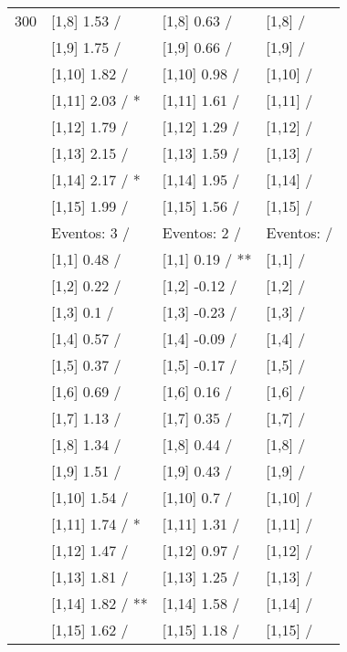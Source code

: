 \begin{table}
\begin{tabular}[t]{llll}
300 & {}[1,8] 1.53  / & {}[1,8] 0.63  / & {}[1,8]  /\\
\addlinespace
 & {}[1,9] 1.75  / & {}[1,9] 0.66  / & {}[1,9]  /\\
 & {}[1,10] 1.82  / & {}[1,10] 0.98  / & {}[1,10]  /\\
 & {}[1,11] 2.03  / * & {}[1,11] 1.61  / & {}[1,11]  /\\
 & {}[1,12] 1.79  / & {}[1,12] 1.29  / & {}[1,12]  /\\
 & {}[1,13] 2.15  / & {}[1,13] 1.59  / & {}[1,13]  /\\
\addlinespace
 & {}[1,14] 2.17  / * & {}[1,14] 1.95  / & {}[1,14]  /\\
 & {}[1,15] 1.99  / & {}[1,15] 1.56  / & {}[1,15]  /\\
 & Eventos:  3 / & Eventos:  2 / & Eventos:   /\\
 & {}[1,1] 0.48  / & {}[1,1] 0.19  / ** & {}[1,1]  /\\
 & {}[1,2] 0.22  / & {}[1,2] -0.12  / & {}[1,2]  /\\
\addlinespace
 & {}[1,3] 0.1  / & {}[1,3] -0.23  / & {}[1,3]  /\\
 & {}[1,4] 0.57  / & {}[1,4] -0.09  / & {}[1,4]  /\\
 & {}[1,5] 0.37  / & {}[1,5] -0.17  / & {}[1,5]  /\\
 & {}[1,6] 0.69  / & {}[1,6] 0.16  / & {}[1,6]  /\\
 & {}[1,7] 1.13  / & {}[1,7] 0.35  / & {}[1,7]  /\\
\addlinespace
500 & {}[1,8] 1.34  / & {}[1,8] 0.44  / & {}[1,8]  /\\
 & {}[1,9] 1.51  / & {}[1,9] 0.43  / & {}[1,9]  /\\
 & {}[1,10] 1.54  / & {}[1,10] 0.7  / & {}[1,10]  /\\
 & {}[1,11] 1.74  / * & {}[1,11] 1.31  / & {}[1,11]  /\\
 & {}[1,12] 1.47  / & {}[1,12] 0.97  / & {}[1,12]  /\\
\addlinespace
 & {}[1,13] 1.81  / & {}[1,13] 1.25  / & {}[1,13]  /\\
 & {}[1,14] 1.82  / ** & {}[1,14] 1.58  / & {}[1,14]  /\\
 & {}[1,15] 1.62  / & {}[1,15] 1.18  / & {}[1,15]  /\\
\bottomrule
\end{tabular}
\end{table}

